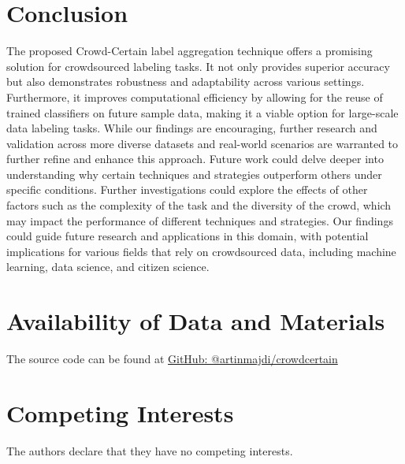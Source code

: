 \documentclass[default]{bst/sn-jnl_mine}%
\begin{document}
\section{Conclusion}\label{sec:crowd.conclusion}
The proposed Crowd-Certain label aggregation technique offers a promising solution for crowdsourced labeling tasks. It not only provides superior accuracy but also demonstrates robustness and adaptability across various settings. Furthermore, it improves computational efficiency by allowing for the reuse of trained classifiers on future sample data, making it a viable option for large-scale data labeling tasks. While our findings are encouraging, further research and validation across more diverse datasets and real-world scenarios are warranted to further refine and enhance this approach. Future work could delve deeper into understanding why certain techniques and strategies outperform others under specific conditions. Further investigations could explore the effects of other factors such as the complexity of the task and the diversity of the crowd, which may impact the performance of different techniques and strategies. Our findings could guide future research and applications in this domain, with potential implications for various fields that rely on crowdsourced data, including machine learning, data science, and citizen science.
\section{Availability of Data and Materials}
The source code can be found at \href{https://github.com/artinmajdi/crowdcertain}{GitHub: @artinmajdi/crowdcertain}
\section*{Competing Interests}
The authors declare that they have no competing interests.
% 


\end{document}
